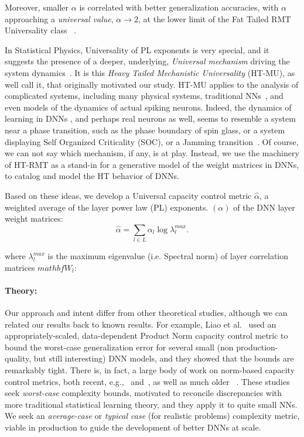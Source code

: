 Moreover, smaller $\alpha$ is correlated with better generalization accuracies, with $\alpha$ approaching a \emph{universal value}, $\alpha\rightarrow 2$,  at the lower limit of the
Fat Tailed RMT Universality class~\cite{MM18_TR} .  

In Statistical Physics, Universality of PL exponents is very special, and it suggests the presence of a deeper, underlying, \emph{Universal mechanism} driving the system dynamics~\cite{SornetteBook,BouchaudPotters03}.
It is this \emph{Heavy Tailed Mechanistic Universality} (HT-MU), as well call it, that originally motivated our study.  
HT-MU applies to the analysis of complicated systems, including many physical systems, traditional NNs~\cite{EB01_BOOK,nishimori01}, and even models of the dynamics of actual spiking neurons.
Indeed, the dynamics of learning in DNNs , and perhaps real neurons as well, 
seems to resemble a system near a phase transition, such as the phase boundary of spin glass, or a system displaying Self Organized Criticality (SOC), or a Jamming transition~\cite{GSdx18_TR,SGd18_TR}. 
Of course, we can not say which mechanism, if any, is at play. 
Instead, we use the machinery of  HT-RMT as a stand-in for a generative model of the weight matrices in DNNs, to catalog and model the HT behavior of DNNs.%

Based on these ideas, we develop a Universal capacity control metric $\hat{\alpha}$,  a weighted average of the layer power law (PL) exponents.
$(\alpha)$ of the DNN layer weight matrices:
\begin{equation}
\hat{\alpha}=\sum_{l\in L}\alpha_{l}\log\lambda_{l}^{max}  .
\end{equation}

where $\lambda_{l}^{max}$ is the  maximum eigenvalue  (i.e. Spectral norm) of layer correlation matrices $mathbf{W}_{l}$: 

\paragraph{Theory:} Our approach and intent differ from other theoretical studies, although we can related our results back to known results.
For example, Liao et al.~\cite{LMBx18_TR} used an appropriately-scaled, data-dependent Product Norm capacity control metric to bound the worst-case generalization 
error for several small (non production-quality, but still interesting) DNN models, and they showed that the bounds are remarkably tight.
There is, in fact, a large body of work on norm-based capacity control metrics, both recent, e.g.,~\cite{LMBx18_TR, SHNx17_TR,PLMx18_TR} and~\cite{NTS14_TR,NTS15,NBMS17_TR,BFT17_TR,YM17_TR,KKB17_TR,NBS17_TR,AGNZ18_TR,ACH18_TR,ZF18_TR}, as well as much older ~\cite{Bar97,MN09_TR}. 
These studies seek \emph{worst-case} complexity bounds, motivated to reconcile discrepancies with more traditional statistical learning theory, and they apply it to quite small NNs.
We seek an \emph{average-case} or \emph{typical case} (for realistic problems) complexity metric, viable in production to guide the development of better DNNs at scale.

